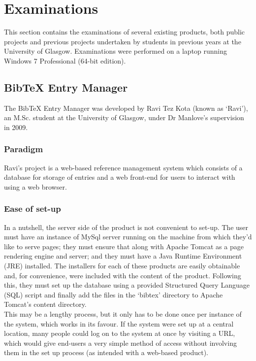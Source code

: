 \documentclass{l4proj}
\newcommand{\BibTeX}{B{\sc ib}\TeX}
\newcommand{\bibtex}{\BibTeX}
\begin{document}
\section{Examinations}
This section contains the examinations of several existing products, both public projects and previous projects undertaken by students in previous years at the University of Glasgow.  Examinations were performed on a laptop running Windows 7 Professional (64-bit edition).

\subsection{\bibtex{} Entry Manager}
The \bibtex{} Entry Manager was developed by Ravi Tez Kota (known as `Ravi'), an M.Sc. student at the University of Glasgow, under Dr Manlove's supervision in 2009.

\subsubsection{Paradigm}
Ravi's project is a web-based reference management system which consists of a database for storage of entries and a web front-end for users to interact with using a web browser.

\subsubsection{Ease of set-up}
In a nutshell, the server side of the product is not convenient to set-up.  The user must have an instance of MySql server running on the machine from which they'd like to serve pages; they must ensure that along with Apache Tomcat as a page rendering engine and server; and they must have a Java Runtime Environment (JRE) installed.  The installers for each of these products are easily obtainable and, for convenience, were included with the content of the product.  Following this, they must set up the database using a provided Structured Query Language (SQL) script and finally add the files in the `bibtex' directory to Apache Tomcat's content directory.  \\

This may be a lengthy process, but it only has to be done once per instance of the system, which works in its favour. If the system were set up at a central location, many people could log on to the system at once by visiting a URL, which would give end-users a very simple method of access without involving them in the set up process (as intended with a web-based product).
\end{document}

